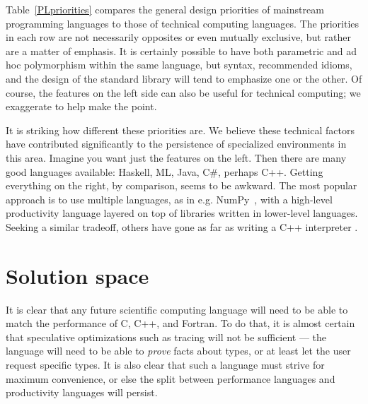 Table~\ref{PLpriorities} compares the general design priorities of mainstream
programming languages to those of technical computing languages.
The priorities in each row are not necessarily opposites or even mutually exclusive,
but rather are a matter of emphasis.
It is certainly possible to have both parametric and ad hoc polymorphism within
the same language, but syntax, recommended idioms, and the design of the standard
library will tend to emphasize one or the other.
Of course, the features on the left side can also be useful for technical computing;
we exaggerate to help make the point.

It is striking how different these priorities are.
We believe these technical factors have contributed significantly to the persistence
of specialized environments in this area.
Imagine you want just the features on the left.
Then there are many good languages available: Haskell, ML, Java, C\#, perhaps C++.
Getting everything on the right, by comparison, seems to be awkward.
The most popular approach is to use multiple languages, as in e.g. NumPy~\cite{numpy},
with a high-level productivity language layered on top of libraries
written in lower-level languages.
Seeking a similar tradeoff, others have gone as far as writing a C++
interpreter \cite{vasilev2012cling}.




\section{Solution space}

It is clear that any future scientific computing language will need to be able to
match the performance of C, C++, and Fortran.
To do that, it is almost certain that speculative optimizations such as tracing
\cite{tracingjit} will not be sufficient ---
the language will need to be able to \emph{prove} facts about types, or at least
let the user request specific types.
It is also clear that such a language must strive for maximum convenience, or else
the split between performance languages and productivity languages will persist.

